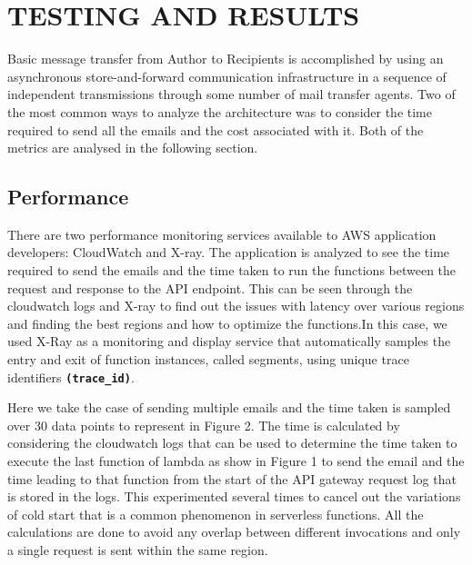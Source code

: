 \chapter{TESTING AND RESULTS}
\label{ch:testing}

Basic message transfer from Author to Recipients is accomplished by using an asynchronous store-and-forward communication infrastructure in a sequence of independent transmissions through some number of mail transfer agents\cite{rfc5598}. Two of the most common ways to analyze the architecture was to consider the time required to send all the emails and the cost associated with it. Both of the metrics are analysed in the following section.

\section{Performance}
There are two performance monitoring services available to AWS application developers: CloudWatch and X-ray.\cite{lin2018tracking}
 The application is analyzed to see the time required to send the emails and the time taken to run the functions between the request and response to the API endpoint. This can be seen through the cloudwatch\cite{awscloudwatch} logs and X-ray to find out the issues with latency over various regions and finding the best regions and how to optimize the functions.In this case, we used X-Ray as a monitoring and display service that automatically samples the entry and exit of function instances, called segments, using unique trace identifiers \textbf{\texttt{(trace\_id)}}\cite{lin2018tracking}\cite{awsxray}.\par

 Here we take the case of sending multiple emails and the time taken is sampled over 30 data points to represent in Figure 2. The time is calculated by considering the cloudwatch logs that can be used to determine the time taken to execute the last function of lambda as show in Figure 1 to send the email and the time leading to that function from the start of the API gateway request log that is stored in the logs. This experimented several times to cancel out the variations of cold start that is a common phenomenon in serverless functions. All the calculations are done to avoid any overlap between different invocations and only a single request is sent within the same region.\par

